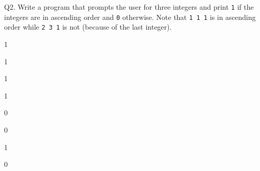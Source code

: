 Q2. Write a program that prompts the user for three integers and print \verb!1! if
the integers are in ascending order and \verb!0! otherwise. Note that
\verb!1 1 1! is in ascending order while \verb!2 3 1! is not (because of the
last integer).

\resett
\nextt
\begin{console}[commandchars=\\\{\}]
1
\end{console}

\nextt
\begin{console}[commandchars=\\\{\}]
1
\end{console}

\nextt
\begin{console}[commandchars=\\\{\}]
1
\end{console}

\nextt
\begin{console}[commandchars=\\\{\}]
1
\end{console}

\nextt
\begin{console}[commandchars=\\\{\}]
0
\end{console}

\nextt
\begin{console}[commandchars=\\\{\}]
0
\end{console}

\nextt
\begin{console}[commandchars=\\\{\}]
1
\end{console}

\nextt
\begin{console}[commandchars=\\\{\}]
0
\end{console}
